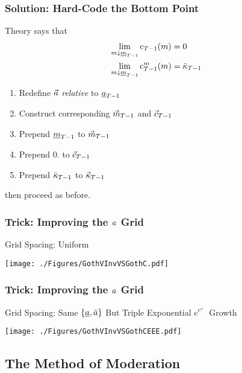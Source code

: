 \documentclass{beamer}
\begin{document}
\begin{frame}
\frametitle{Solution: Hard-Code the Bottom Point}

Theory says that
\begin{equation}\begin{gathered}\begin{aligned}
  \lim_{m \downarrow \underline{m}_{T-1}} \mathrm{c}_{T-1}(m)  & = 0
\\ \lim_{m \downarrow \underline{m}_{T-1}} \mathrm{c}_{T-1}^{m}(m)  & = {\bar{\kappa}}_{T-1}
\end{aligned}\end{gathered}\end{equation}

\medskip 

\begin{enumerate}
\item Redefine $\vec{a}$ {\it relative} to $\uline{\aRat}_{T-1}$
\item Construct corresponding $\vec{m}_{T-1}$ and $\vec{c}_{T-1}$
\item Prepend $\uline{\mRat}_{T-1}$ to $\vec{m}_{T-1}$
\item Prepend $0.$ to $\vec{c}_{T-1}$
\item Prepend ${\bar{\kappa}}_{T-1}$ to $\vec{{\kappa}}_{T-1}$
\end{enumerate}
then proceed as before.

\end{frame}

\begin{frame}
\frametitle{Trick: Improving the $a$ Grid}
Grid Spacing: Uniform

\texttt{[image: ./Figures/GothVInvVSGothC.pdf]}

\end{frame}


\begin{frame}
\frametitle{Trick: Improving the $a$ Grid}
Grid Spacing: Same $\{\uline{\aRat},\bar{\aRat}\}$ But Triple Exponential $e^{e^{e^{...}}}$ Growth

\texttt{[image: ./Figures/GothVInvVSGothCEEE.pdf]}

\end{frame}


\subsection{The Method of Moderation}
\end{document}
